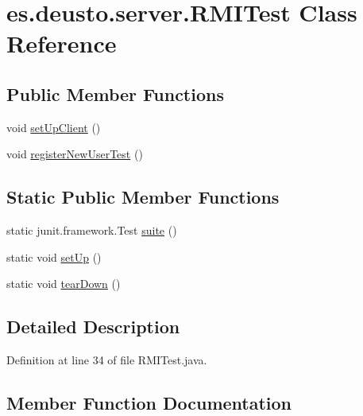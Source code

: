 \hypertarget{classes_1_1deusto_1_1server_1_1_r_m_i_test}{}\section{es.\+deusto.\+server.\+R\+M\+I\+Test Class Reference}
\label{classes_1_1deusto_1_1server_1_1_r_m_i_test}
\subsection*{Public Member Functions}
\begin{DoxyCompactItemize}
\item 
void \hyperlink{classes_1_1deusto_1_1server_1_1_r_m_i_test_ae18833c79a18cfde52e5e474d4dc9608}{set\+Up\+Client} ()
\item 
void \hyperlink{classes_1_1deusto_1_1server_1_1_r_m_i_test_a54c5099976b8a10b94d97e9ca5b56887}{register\+New\+User\+Test} ()
\end{DoxyCompactItemize}
\subsection*{Static Public Member Functions}
\begin{DoxyCompactItemize}
\item 
static junit.\+framework.\+Test \hyperlink{classes_1_1deusto_1_1server_1_1_r_m_i_test_aa7e6688b24d65fd77edadd24a4c93c97}{suite} ()
\item 
static void \hyperlink{classes_1_1deusto_1_1server_1_1_r_m_i_test_a2cd940f51ed95fb8cc3676df31fc84ea}{set\+Up} ()
\item 
static void \hyperlink{classes_1_1deusto_1_1server_1_1_r_m_i_test_a069a29652068120e6807a325863d09aa}{tear\+Down} ()
\end{DoxyCompactItemize}


\subsection{Detailed Description}


Definition at line 34 of file R\+M\+I\+Test.\+java.



\subsection{Member Function Documentation}
\mbox{\label{classes_1_1deusto_1_1server_1_1_r_m_i_test_a54c5099976b8a10b94d97e9ca5b56887}} 
